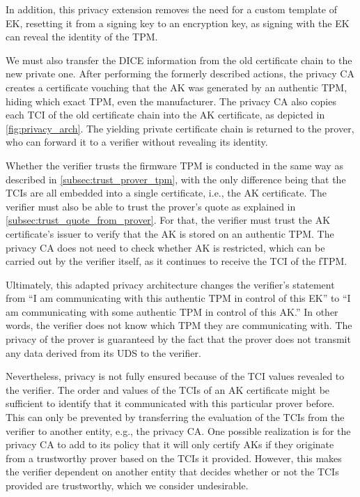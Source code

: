 In addition, this privacy extension removes the need for a custom template of \ac{EK}, resetting it from a signing key to an encryption key, as signing with the EK can reveal the identity of the TPM\@.



We must also transfer the DICE information from the old certificate chain to the new private one.
After performing the formerly described actions, the privacy CA creates a certificate vouching that the AK was generated by an authentic TPM, hiding which exact TPM, even the manufacturer.
The privacy CA also copies each TCI of the old certificate chain into the AK certificate, as depicted in \autoref{fig:privacy_arch}.
The yielding private certificate chain is returned to the prover, who can forward it to a verifier without revealing its identity.

Whether the verifier trusts the firmware TPM is conducted in the same way as described in \autoref{subsec:trust_prover_tpm}, with the only difference being that the TCIs are all embedded into a single certificate, i.e., the AK certificate.
The verifier must also be able to trust the prover's quote as explained in \autoref{subsec:trust_quote_from_prover}.
For that, the verifier must trust the AK certificate's issuer to verify that the \ac{AK} is stored on an authentic TPM\@.
The privacy CA does not need to check whether AK is restricted, which can be carried out by the verifier itself, as it continues to receive the TCI of the fTPM\@.

Ultimately, this adapted privacy architecture changes the verifier's statement from ``I am communicating with this authentic TPM in control of this EK'' to ``I am communicating with some authentic TPM in control of this AK.''
In other words, the verifier does not know which TPM they are communicating with.
The privacy of the prover is guaranteed by the fact that the prover does not transmit any data derived from its \ac{UDS} to the verifier.

Nevertheless, privacy is not fully ensured because of the TCI values revealed to the verifier.
The order and values of the TCIs of an AK certificate might be sufficient to identify that it communicated with this particular prover before.
This can only be prevented by transferring the evaluation of the TCIs from the verifier to another entity, e.g., the privacy CA\@.
One possible realization is for the privacy CA to add to its policy that it will only certify AKs if they originate from a trustworthy prover based on the TCIs it provided.
However, this makes the verifier dependent on another entity that decides whether or not the TCIs provided are trustworthy, which we consider undesirable.

